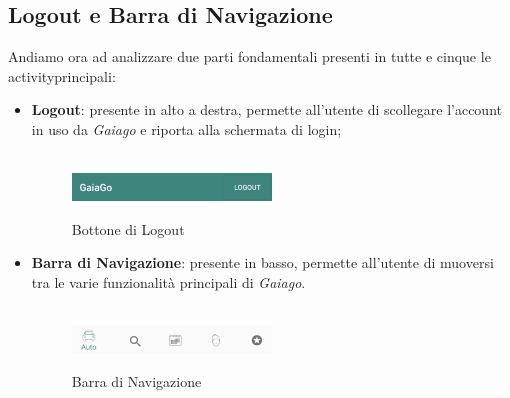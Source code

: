 \subsection{Logout e Barra di Navigazione}
Andiamo ora ad analizzare due parti fondamentali presenti in tutte e cinque le activity\glosp principali:
\begin{itemize}
	\item \textbf{Logout}: presente in alto a destra, permette all'utente di scollegare l'account in uso da \textit{Gaiago} e riporta alla schermata di login;
	\\\\
	  \begin{figure}[H] 
	 	\centering 
	 	\includegraphics[width=0.5\textwidth]{res/images/logout.png}\\
	 	\caption{Bottone di Logout}
	 	\label{Login}
	 \end{figure}
 	\item  \textbf{Barra di Navigazione}: presente in basso, permette all'utente di muoversi tra le varie funzionalità principali di \textit{Gaiago}.
 	\\\\
 	  \begin{figure}[H] 
 	  	\centering 
 	  	\includegraphics[width=0.5\textwidth]{res/images/barra_navigazione.png}\\
 	  	\caption{Barra di Navigazione}
 	  	\label{Login}
 	  \end{figure}
\end{itemize}
\pagebreak

